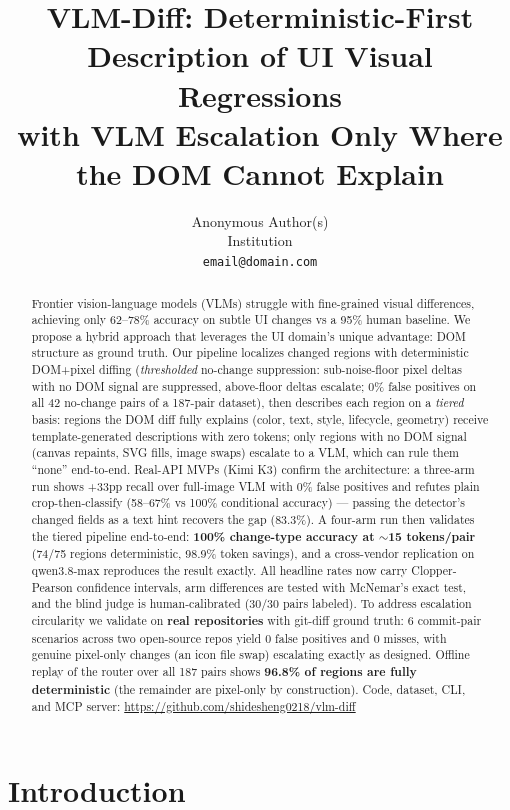\documentclass[10pt,twocolumn,letterpaper]{article}
\title{VLM-Diff: Deterministic-First Description of UI Visual Regressions\\with VLM Escalation Only Where the DOM Cannot Explain}
\author{
Anonymous Author(s) \\
Institution \\
{\tt\small email@domain.com}
}
\begin{document}
\maketitle

\begin{abstract}
Frontier vision-language models (VLMs) struggle with fine-grained visual differences, achieving only 62--78\% accuracy on subtle UI changes vs a 95\% human baseline. We propose a hybrid approach that leverages the UI domain's unique advantage: DOM structure as ground truth. Our pipeline localizes changed regions with deterministic DOM+pixel diffing (\textit{thresholded} no-change suppression: sub-noise-floor pixel deltas with no DOM signal are suppressed, above-floor deltas escalate; 0\% false positives on all 42 no-change pairs of a 187-pair dataset), then describes each region on a \textit{tiered} basis: regions the DOM diff fully explains (color, text, style, lifecycle, geometry) receive template-generated descriptions with zero tokens; only regions with no DOM signal (canvas repaints, SVG fills, image swaps) escalate to a VLM, which can rule them ``none'' end-to-end. Real-API MVPs (Kimi K3) confirm the architecture: a three-arm run shows +33pp recall over full-image VLM with 0\% false positives and refutes plain crop-then-classify (58--67\% vs 100\% conditional accuracy) — passing the detector's changed fields as a text hint recovers the gap (83.3\%). A four-arm run then validates the tiered pipeline end-to-end: \textbf{100\% change-type accuracy at ${\sim}$15 tokens/pair} (74/75 regions deterministic, 98.9\% token savings), and a cross-vendor replication on qwen3.8-max reproduces the result exactly. All headline rates now carry Clopper-Pearson confidence intervals, arm differences are tested with McNemar's exact test, and the blind judge is human-calibrated (30/30 pairs labeled). To address escalation circularity we validate on \textbf{real repositories} with git-diff ground truth: 6 commit-pair scenarios across two open-source repos yield 0 false positives and 0 misses, with genuine pixel-only changes (an icon file swap) escalating exactly as designed. Offline replay of the router over all 187 pairs shows \textbf{96.8\% of regions are fully deterministic} (the remainder are pixel-only by construction). Code, dataset, CLI, and MCP server: \url{https://github.com/shidesheng0218/vlm-diff}
\end{abstract}

\section{Introduction}
\end{document}
